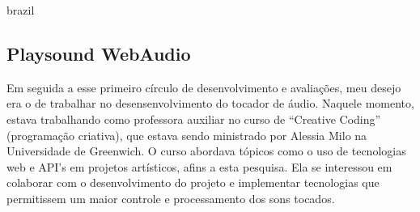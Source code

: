 \begin{otherlanguage*}{brazil}
\begin{description}
\end{description}












\subsection{Playsound WebAudio}

Em seguida a esse primeiro círculo de desenvolvimento e avaliações, meu desejo era o de trabalhar no desensenvolvimento do tocador de áudio. Naquele momento, estava trabalhando como professora auxiliar no curso de ``Creative Coding'' (programação criativa), que estava sendo ministrado por Alessia Milo na Universidade de Greenwich. O curso abordava tópicos como o uso de tecnologias web e API's em projetos artísticos, afins a
 esta pesquisa. Ela se interessou em colaborar com o desenvolvimento do projeto e implementar tecnologias que permitissem um maior controle e processamento dos sons tocados.


\end{otherlanguage*}
